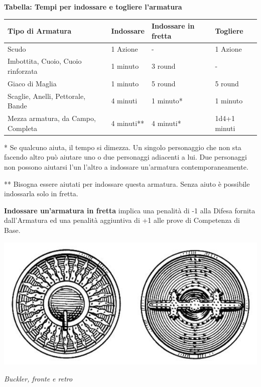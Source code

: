 \textbf{Tabella: Tempi per indossare e togliere l'armatura}

\medskip

\noindent\begin{tabular}{llll}
\textbf{Tipo di Armatura}& \textbf{Indossare} & \textbf{Indossare in fretta} & \textbf{Togliere}\\
\toprule
Scudo& 1 Azione & - & 1 Azione\\
Imbottita, Cuoio, Cuoio rinforzata& 1 minuto& 3 round& - \\
Giaco di Maglia& 1 minuto& 5 round& 5 round\\
Scaglie, Anelli, Pettorale, Bande & 4 minuti & 1 minuto{*}& 1 minuto\\
Mezza armatura, da Campo, Completa& 4 minuti{*}{*}& 4 minuti{*}& 1d4+1 minuti
\end{tabular}

\bigskip

\begin{multicols}{2}

{*} Se qualcuno aiuta, il tempo si dimezza. Un singolo personaggio che non sta facendo altro può aiutare uno o due personaggi adiacenti a lui. Due personaggi non possono aiutarsi l'un l'altro a indossare un'armatura contemporaneamente.

{*}{*} Bisogna essere aiutati per indossare questa armatura. Senza aiuto è possibile indossarla solo in fretta.

\textbf{Indossare un'armatura in fretta} implica una penalità di -1 alla Difesa fornita dall'Armatura ed una penalità aggiuntiva di +1 alle prove di Competenza di Base.

\end{multicols}




\vfill
\begin{center}
	\includegraphics[width=0.65\linewidth]{immagini/buckler.png}

	\emph{Buckler, fronte e retro}
\end{center}


\pagebreak

